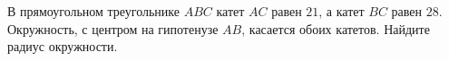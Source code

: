 \begin{ex}
	\begin{condition}
		В прямоугольном треугольнике \( ABC  \) катет \( AC  \) равен \( 21 \), а катет \( BC  \) равен \( 28 \). Окружность, с центром на гипотенузе \( AB \), касается обоих катетов. Найдите радиус окружности.
	\end{condition}
\end{ex}